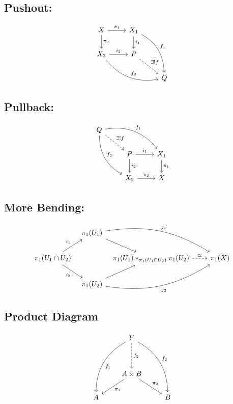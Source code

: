 \documentclass{article}
\begin{document}
\subsection*{Pushout:}
\begin{equation*}
\begin{tikzcd}
 X \arrow[r,"\pi_1"] \arrow[d,"\pi_2"] & X_1 \arrow[d,"i_1"] \arrow[ddr,bend left, "f_1"]\\
 X_2 \arrow[r,"i_2"] \arrow[drr,bend right, "f_2"] & P \arrow[dr, dashed, "\exists! f"]\\
  & & Q
\end{tikzcd}
\end{equation*}

\subsection*{Pullback:}
\begin{equation*}
\begin{tikzcd}
 Q \arrow[drr, bend left, "f_1"] \arrow[ddr, bend right, "f_2"] \arrow[dr, dashed, "\exists! f"]& & \\
 & P \arrow[d,"i_2"] \arrow[r,"i_1"] & X_1 \arrow[d,"\pi_1"] \\
 & X_2 \arrow[r,"\pi_2"] & X
\end{tikzcd}
\end{equation*}

\subsection*{More Bending:}

$$
\begin{tikzcd}[column sep=tiny]
& \pi_1(U_1) \arrow[dr] \arrow[drr, "j_1", bend left=20]
&
&[1.5em] \\
\pi_1(U_1\cap U_2) \arrow[ur, "i_1"] \arrow[dr, "i_2"']
&
& \pi_1(U_1) \ast_{ \pi_1(U_1\cap U_2)} \pi_1(U_2) \arrow[r, dashed, "\simeq"]
& \pi_1(X) \\
& \pi_1(U_2) \arrow[ur]\arrow[urr, "j_2"', bend right=20]
&
&
\end{tikzcd}
$$

\subsection*{Product Diagram}
$$
\begin{tikzcd}
& Y \arrow[rddd,bend left,"f_2"] \arrow[lddd,bend right, "f_1"] \arrow[dd,dashed ,"f_2"]  & \\
& & \\
 & A\times B \arrow[ld,"\pi_1"] \arrow[rd,"\pi_2"] & \\
 A & & B
\end{tikzcd}
$$
\end{document}
